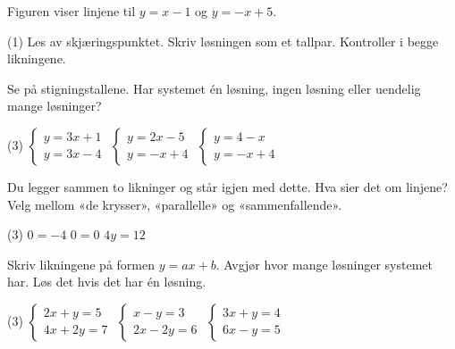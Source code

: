 
Figuren viser linjene til $y = x - 1$ og $y = -x + 5$.
\begin{center}
\end{center}
\begin{tasks}(1)
  \task Les av skjæringspunktet.
  \task Skriv løsningen som et tallpar. Kontroller i begge likningene.
\end{tasks}

Se på stigningstallene. Har systemet én løsning, ingen løsning eller uendelig mange løsninger?
\begin{tasks}(3)
  \task $\begin{cases} y = 3x + 1\\ y = 3x - 4 \end{cases}$
  \task $\begin{cases} y = 2x - 5\\ y = -x + 4 \end{cases}$
  \task $\begin{cases} y = 4 - x\\ y = -x + 4 \end{cases}$
\end{tasks}

Du legger sammen to likninger og står igjen med dette. Hva sier det om linjene?
Velg mellom «de krysser», «parallelle» og «sammenfallende».
\begin{tasks}(3)
  \task $0 = -4$
  \task $0 = 0$
  \task $4y = 12$
\end{tasks}


Skriv likningene på formen $y = ax + b$. Avgjør hvor mange løsninger systemet har. Løs det hvis det har én løsning.
\begin{tasks}(3)
  \task $\begin{cases} 2x + y = 5\\ 4x + 2y = 7 \end{cases}$
  \task $\begin{cases} x - y = 3\\ 2x - 2y = 6 \end{cases}$
  \task $\begin{cases} 3x + y = 4\\ 6x - y = 5 \end{cases}$
\end{tasks}

